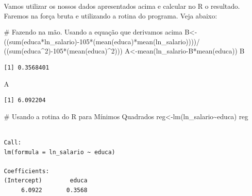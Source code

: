 \documentclass[
  letterpaper,
  DIV=11,
  numbers=noendperiod]{scrartcl}
\newenvironment{Shaded}{\begin{snugshade}}{\end{snugshade}}
\newcommand{\CommentTok}[1]{\textcolor[rgb]{0.37,0.37,0.37}{#1}}
\newcommand{\DecValTok}[1]{\textcolor[rgb]{0.68,0.00,0.00}{#1}}
\newcommand{\FunctionTok}[1]{\textcolor[rgb]{0.28,0.35,0.67}{#1}}
\newcommand{\NormalTok}[1]{\textcolor[rgb]{0.00,0.23,0.31}{#1}}
\newcommand{\OtherTok}[1]{\textcolor[rgb]{0.00,0.23,0.31}{#1}}
\newcommand{\SpecialCharTok}[1]{\textcolor[rgb]{0.37,0.37,0.37}{#1}}
\begin{document}
Vamos utilizar os nossos dados apresentados acima e calcular no R o
resultado. Faremos na força bruta e utilizando a rotina do programa.
Veja abaixo:

\begin{Shaded}
\begin{Highlighting}[]
\CommentTok{\# Fazendo na mão. Usando a equação que derivamos acima}
\NormalTok{B}\OtherTok{\textless{}{-}}\NormalTok{((}\FunctionTok{sum}\NormalTok{(educa}\SpecialCharTok{*}\NormalTok{ln\_salario)}\SpecialCharTok{{-}}\DecValTok{105}\SpecialCharTok{*}\NormalTok{(}\FunctionTok{mean}\NormalTok{(educa)}\SpecialCharTok{*}\FunctionTok{mean}\NormalTok{(ln\_salario))))}\SpecialCharTok{/}
\NormalTok{  ((}\FunctionTok{sum}\NormalTok{(educa}\SpecialCharTok{\^{}}\DecValTok{2}\NormalTok{)}\SpecialCharTok{{-}}\DecValTok{105}\SpecialCharTok{*}\NormalTok{(}\FunctionTok{mean}\NormalTok{(educa)}\SpecialCharTok{\^{}}\DecValTok{2}\NormalTok{)))}
\NormalTok{A}\OtherTok{\textless{}{-}}\FunctionTok{mean}\NormalTok{(ln\_salario}\SpecialCharTok{{-}}\NormalTok{B}\SpecialCharTok{*}\FunctionTok{mean}\NormalTok{(educa))}
\NormalTok{B}
\end{Highlighting}
\end{Shaded}

\begin{verbatim}
[1] 0.3568401
\end{verbatim}

\begin{Shaded}
\begin{Highlighting}[]
\NormalTok{A}
\end{Highlighting}
\end{Shaded}

\begin{verbatim}
[1] 6.092204
\end{verbatim}

\begin{Shaded}
\begin{Highlighting}[]
\CommentTok{\# Usando a rotina do R para Mínimos Quadrados}
\NormalTok{reg}\OtherTok{\textless{}{-}}\FunctionTok{lm}\NormalTok{(ln\_salario}\SpecialCharTok{\textasciitilde{}}\NormalTok{educa)}
\NormalTok{reg}
\end{Highlighting}
\end{Shaded}

\begin{verbatim}

Call:
lm(formula = ln_salario ~ educa)

Coefficients:
(Intercept)        educa  
     6.0922       0.3568  
\end{verbatim}
\end{document}
